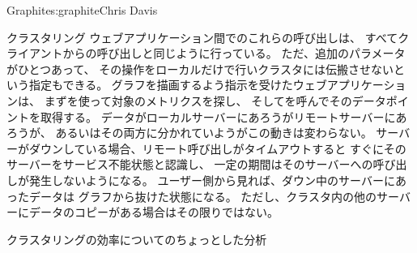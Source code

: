 \begin{aosachapter}{Graphite}{s:graphite}{Chris Davis}
\begin{aosasect1}{クラスタリング}
ウェブアプリケーション間でのこれらの呼び出しは、
すべてクライアントからの呼び出しと同じように行っている。
ただ、追加のパラメータがひとつあって、
その操作をローカルだけで行いクラスタには伝搬させないという指定もできる。
グラフを描画するよう指示を受けたウェブアプリケーションは、
まずを使って対象のメトリクスを探し、
そしてを呼んでそのデータポイントを取得する。
データがローカルサーバーにあろうがリモートサーバーにあろうが、
あるいはその両方に分かれていようがこの動きは変わらない。
サーバーがダウンしている場合、リモート呼び出しがタイムアウトすると
すぐにそのサーバーをサービス不能状態と認識し、
一定の期間はそのサーバーへの呼び出しが発生しないようになる。
ユーザー側から見れば、ダウン中のサーバーにあったデータは
グラフから抜けた状態になる。
ただし、クラスタ内の他のサーバーにデータのコピーがある場合はその限りではない。

\begin{aosasect2}{クラスタリングの効率についてのちょっとした分析}


\end{aosasect2}
\end{aosasect1}
\end{aosachapter}
